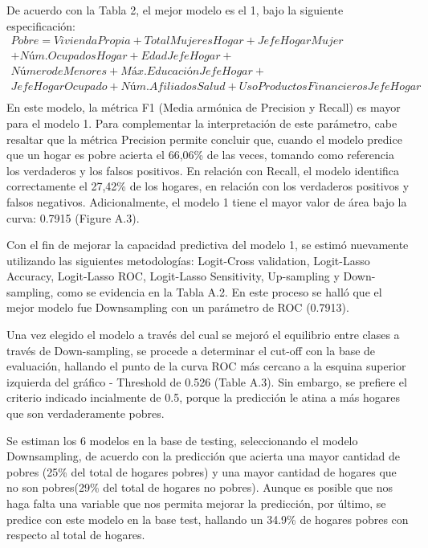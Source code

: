 \documentclass[11pt]{article}
\begin{document}
\justify
De acuerdo con la Tabla 2, el mejor modelo es el 1, bajo la siguiente especificación:
 \begin{equation}
   \begin{split} 
 Pobre = Vivienda Propia + Total Mujeres Hogar + Jefe Hogar Mujer \\
 + Núm. Ocupados Hogar+  Edad Jefe Hogar + \\
        Número de Menores + Máx. Educación Jefe Hogar + \\
        Jefe Hogar Ocupado + Núm. Afiliados Salud + Uso Productos Financieros Jefe Hogar \\
\label{eqn:kfold} \end{split} \end{equation}
\justify
En este modelo, la métrica F1 (Media armónica de Precision y Recall) es mayor para el modelo 1. Para complementar la interpretación de este parámetro, cabe resaltar que la métrica Precision permite concluir que, cuando el modelo predice que un hogar es pobre acierta el 66,06\% de las veces, tomando como referencia los verdaderos y los falsos positivos. En relación con Recall, el modelo identifica correctamente el 27,42\% de los hogares, en relación con los verdaderos positivos y falsos negativos. Adicionalmente, el modelo 1 tiene el mayor valor de área bajo la curva: 0.7915 (Figure A.3).

\justify
Con el fin de mejorar la capacidad predictiva del modelo 1, se estimó nuevamente utilizando las siguientes metodologías: Logit-Cross validation, Logit-Lasso Accuracy, Logit-Lasso ROC, Logit-Lasso Sensitivity, Up-sampling y Down-sampling, como se evidencia en la Tabla A.2. En este proceso se halló que el mejor modelo fue Downsampling con un parámetro de ROC (0.7913). 

\justify
Una vez elegido el modelo a través del cual se mejoró el equilibrio entre clases a través de Down-sampling, se procede a determinar el cut-off con la base de evaluación, hallando el punto de la curva ROC más cercano a la esquina superior izquierda del gráfico - Threshold de 0.526 (Table A.3). Sin embargo, se prefiere el criterio indicado incialmente de 0.5, porque la predicción le atina a más hogares que son verdaderamente pobres.

\justify
Se estiman los 6 modelos en la base de testing, seleccionando el modelo Downsampling, de acuerdo con la predicción que acierta una mayor cantidad de pobres (25\% del total de hogares pobres) y una mayor cantidad de hogares que no son pobres(29\% del total de hogares no pobres). Aunque es posible que nos haga falta una variable que nos permita mejorar la predicción, por último, se predice con este modelo en la base test, hallando un 34.9\% de hogares pobres con respecto al total de hogares. 
\end{document}
